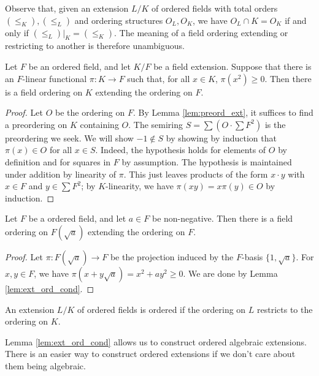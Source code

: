Observe that, given an extension $L/K$ of ordered fields with total orders $(\leq_K),(\leq_L)$ and ordering structures $O_L,O_K$, we have $O_L\cap K=O_K$ if and only if $(\leq_L)|_K=(\leq_K)$. The meaning of a field ordering extending or restricting to another is therefore unambiguous.

\begin{lemma}
  \label{lem:ext_ord_cond}
  Let $F$ be an ordered field, and let $K/F$ be a field extension. Suppose that there is an $F$-linear functional $\pi:K\to F$ such that, for all $x\in K$, $\pi(x^2)\geq0$. Then there is a field ordering on $K$ extending the ordering on $F$.
\end{lemma}
\begin{proof}
  Let $O$ be the ordering on $F$. By Lemma \ref{lem:preord_ext}, it suffices to find a preordering on $K$ containing $O$. The semiring $S=\sum(O\cdot\sum F^2)$ is the preordering we seek. We will show $-1\notin S$ by showing by induction that $\pi(x)\in O$ for all $x\in S$. Indeed, the hypothesis holds for elements of $O$ by definition and for squares in $F$ by assumption. The hypothesis is maintained under addition by linearity of $\pi$. This just leaves products of the form $x\cdot y$ with $x\in F$ and $y\in\sum F^2$; by $K$-linearity, we have $\pi(xy)=x\pi(y)\in O$ by induction.
\end{proof}

\begin{corollary}
  \label{cor:ext_ord_to_adj_sqrt}
  Let $F$ be a ordered field, and let $a\in F$ be non-negative. Then there is a field ordering on $F(\sqrt{a})$ extending the ordering on $F$.
\end{corollary}
\begin{proof}
  Let $\pi:F(\sqrt{a})\to F$ be the projection induced by the $F$-basis $\{1,\sqrt{a}\}$. For $x,y\in F$, we have $\pi(x+y\sqrt{a})=x^2+ay^2\geq0$. We are done by Lemma \ref{lem:ext_ord_cond}.
\end{proof}

\begin{definition}
  \label{def:ordered_ext}
  An extension $L/K$ of ordered fields is ordered if the ordering on $L$ restricts to the ordering on $K$.
\end{definition}

Lemma \ref{lem:ext_ord_cond} allows us to construct ordered algebraic extensions. There is an easier way to construct ordered extensions if we don't care about them being algebraic.

